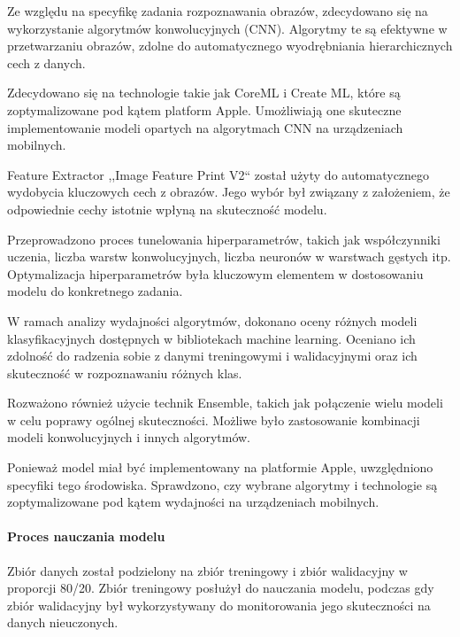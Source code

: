 \documentclass[12pt, a4paper, twoside, openany]{book}
\newcommand{\forceindent}{\leavevmode{\parindent=1.3em\indent}}
\begin{document}
Ze względu na specyfikę zadania rozpoznawania obrazów, zdecydowano się na wykorzystanie algorytmów konwolucyjnych (CNN).
Algorytmy te są efektywne w przetwarzaniu obrazów, zdolne do automatycznego wyodrębniania hierarchicznych cech z danych.

Zdecydowano się na technologie takie jak CoreML i Create ML, które są zoptymalizowane pod kątem platform Apple.
Umożliwiają one skuteczne implementowanie modeli opartych na algorytmach CNN na urządzeniach mobilnych.

Feature Extractor ,,Image Feature Print V2`` został użyty do automatycznego wydobycia kluczowych cech z obrazów.
Jego wybór był związany z założeniem, że odpowiednie cechy istotnie wpłyną na skuteczność modelu.

Przeprowadzono proces tunelowania hiperparametrów, takich jak współczynniki uczenia, liczba warstw konwolucyjnych, liczba neuronów w warstwach gęstych itp.
Optymalizacja hiperparametrów była kluczowym elementem w dostosowaniu modelu do konkretnego zadania.

W ramach analizy wydajności algorytmów, dokonano oceny różnych modeli klasyfikacyjnych dostępnych w bibliotekach machine learning.
Oceniano ich zdolność do radzenia sobie z danymi treningowymi i walidacyjnymi oraz ich skuteczność w rozpoznawaniu różnych klas.

Rozważono również użycie technik Ensemble, takich jak połączenie wielu modeli w celu poprawy ogólnej skuteczności.
Możliwe było zastosowanie kombinacji modeli konwolucyjnych i innych algorytmów.

Ponieważ model miał być implementowany na platformie Apple, uwzględniono specyfiki tego środowiska.
Sprawdzono, czy wybrane algorytmy i technologie są zoptymalizowane pod kątem wydajności na urządzeniach 
mobilnych.

\paragraph{Proces nauczania modelu\\}
\forceindent Zbiór danych został podzielony na zbiór treningowy i zbiór walidacyjny w proporcji 80/20.
Zbiór treningowy posłużył do nauczania modelu, podczas gdy zbiór walidacyjny był wykorzystywany do monitorowania jego skuteczności na danych nieuczonych.
\end{document}
